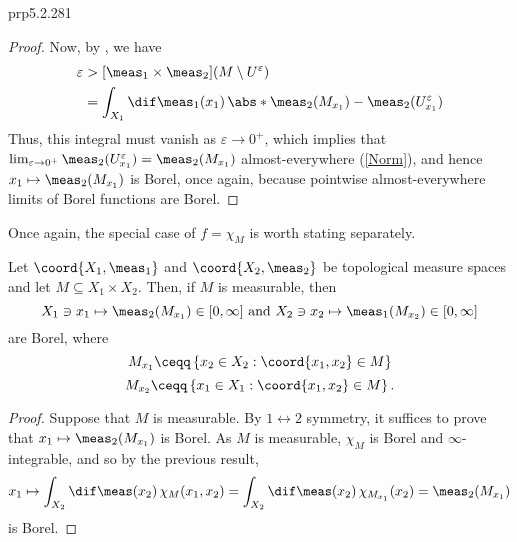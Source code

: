\begin{prp}{}{prp5.2.281}
\begin{proof}
Now, by , we have
\begin{equation}
\begin{split}
\varepsilon & >[\meas _1\times \meas _2](M\setminus U^{\varepsilon}) \\
& =\int _{X_1}\dif \meas _1(x_1)\, \abs*{\meas _2(M_{x_1})-\meas _2(U_{x_1}^{\varepsilon})}
\end{split}
\end{equation}
Thus, this integral must vanish as $\varepsilon \to 0^+$, which implies that $\lim _{\varepsilon \to 0^+}\meas _2(U_{x_1}^{\varepsilon})=\meas _2(M_{x_1})$ almost-everywhere (\cref{Norm}), and hence $x_1\mapsto \meas _2(M_{x_1})$ is Borel, once again, because pointwise almost-everywhere limits of Borel functions are Borel.
\end{proof}
\end{prp}
Once again, the special case of $f=\chi _M$ is worth stating separately.
\begin{crl}{}{}
Let $\coord{X_1,\meas _1}$ and $\coord{X_2,\meas _2}$ be topological measure spaces and let $M\subseteq X_1\times X_2$.  Then, if $M$ is measurable, then
\begin{equation}
X_1\ni x_1\mapsto \meas _2(M_{x_1})\in [0,\infty ]\text{ and }X_2\ni x_2\mapsto \meas _1(M_{x_2})\in [0,\infty ]
\end{equation}
are Borel, where
\begin{equation}
M_{x_1}\ceqq \left\{ x_2\in X_2:\coord{x_1,x_2}\in M\right\}
\end{equation}
\begin{equation}
M_{x_2}\ceqq \left\{ x_1\in X_1:\coord{x_1,x_2}\in M\right\} .
\end{equation}
\begin{proof}
Suppose that $M$ is measurable.  By $1\leftrightarrow 2$ symmetry, it suffices to prove that $x_1\mapsto \meas _2(M_{x_1})$ is Borel.  As $M$ is measurable, $\chi _M$ is Borel and $\infty$-integrable, and so by the previous result,
\begin{equation}
x_1\mapsto \int _{X_2}\dif \meas (x_2)\, \chi _M(x_1,x_2)=\int _{X_2}\dif \meas (x_2)\, \chi _{M_{x_1}}(x_2)=\meas _2(M_{x_1})
\end{equation}
is Borel.
\end{proof}
\end{crl}

